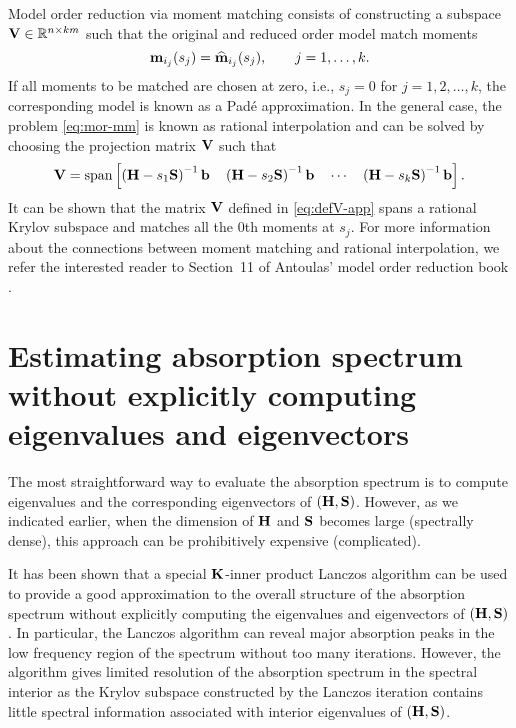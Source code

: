 Model order reduction via moment matching consists of constructing a subspace $\bV \inR[n][km]$ such that the original and reduced order model match moments
\begin{equation}
  \mathbf{m}_{i_j}(s_j) = \widehat{\mathbf{m}}_{i_j}(s_j), \qquad j = 1,\ldots,k.
  \label{eq:mor-mm}
\end{equation}
If all moments to be matched are chosen at zero, i.e., $s_j = 0$ for $j = 1,2,\ldots,k$, the corresponding model is known as a Pad\'{e} approximation. In the general case, the problem \eqref{eq:mor-mm} is known as rational interpolation and can be solved by choosing the projection matrix $\mathbf{V}$ such that
\begin{equation}
  \mathbf{V} = \mathrm{span}\left[  \left( \mathbf{H} - s_1\mathbf{S} \right)^{-1} \mathbf{b} \quad
                   \left( \mathbf{H} - s_2\mathbf{S} \right)^{-1} \mathbf{b} \quad
                    \cdots \quad
                   \left( \mathbf{H} - s_k\mathbf{S} \right)^{-1} \mathbf{b}  \right].
  \label{eq:defV-app}
\end{equation}
It can be shown that the matrix $\mathbf{V}$ defined in \eqref{eq:defV-app} spans a rational Krylov subspace and matches all the $0$th moments at $s_j$. For more information about the connections between moment matching and rational interpolation, we refer the interested reader to Section~11 of Antoulas' model order reduction book \cite{Antoulas2005}.

\section{Estimating absorption spectrum without explicitly computing eigenvalues and eigenvectors}
\label{sec:est}

The most straightforward way to evaluate the absorption spectrum is to compute eigenvalues and the corresponding eigenvectors of $(\mathbf{H},\mathbf{S})$. However, as we indicated earlier, when the dimension of $\mathbf{H}$ and $\mathbf{S}$ becomes large (spectrally dense), this approach can be prohibitively expensive (complicated). 

It has been shown\cite{brabec_etal2015} that a special $\mathbf{K}$-inner product
Lanczos algorithm can be used to provide a good approximation to the overall
structure of the absorption spectrum without explicitly computing the
eigenvalues and eigenvectors of $(\mathbf{H},\mathbf{S})$.  In particular, the Lanczos
algorithm can reveal major absorption peaks in the low frequency region of the
spectrum without too many iterations. However, the algorithm gives limited
resolution of the absorption spectrum in the spectral interior as the
Krylov subspace constructed by the Lanczos iteration contains little spectral
information associated with interior eigenvalues of $(\mathbf{H},\mathbf{S})$.

